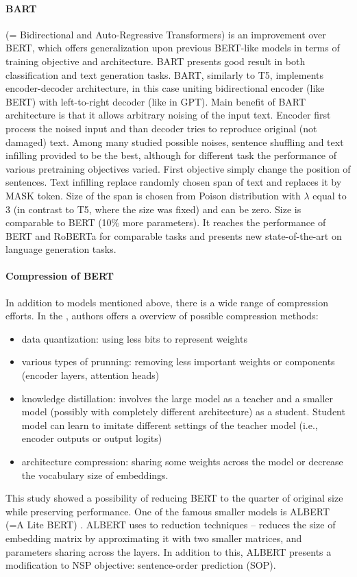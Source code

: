 \paragraph{BART} (= Bidirectional and Auto-Regressive Transformers) \citep{Lewis2019} is an improvement over BERT, which offers generalization upon previous BERT-like models in terms of training objective and architecture. BART presents good result in both classification and text generation tasks. BART, similarly to T5, implements encoder-decoder architecture, in this case uniting bidirectional encoder (like BERT) with left-to-right decoder (like in GPT). Main benefit of BART architecture is that it allows arbitrary noising of the input text. Encoder first process the noised input and than decoder tries to reproduce original (not damaged) text. Among many studied possible noises, sentence shuffling and text infilling provided to be the best, although for different task the performance of various pretraining objectives varied. First objective simply change the position of sentences. Text infilling replace randomly chosen span of text and replaces it by MASK token. Size of the span is chosen from Poison distribution with $\lambda$ equal to 3 (in contrast to T5, where the size was fixed) and can be zero. Size is comparable to BERT (10\% more parameters). It reaches the performance of BERT and RoBERTa  for comparable tasks and presents new state-of-the-art on language generation tasks.
\paragraph{Compression of BERT} In addition to models mentioned above, there is a wide range of compression efforts.  In the \citep{Ganesh2020}, authors offers a overview of possible compression methods:
\begin{itemize}
\item data quantization: using less bits to represent weights
\item various types of prunning: removing less important weights or components (encoder layers, attention heads)
\item knowledge distillation: involves the large model as a teacher and a smaller model (possibly with completely different architecture) as a student. Student model can learn to imitate different settings of the teacher model (i.e., encoder outputs or output logits)
\item architecture compression: sharing some weights across the model or decrease the vocabulary size of embeddings.
\end{itemize}
This study showed a possibility of reducing BERT to the quarter of original size while preserving performance. One of the famous smaller models is ALBERT (=A Lite BERT) \citep{Lan2019}. ALBERT uses to reduction techniques -- reduces the size of embedding matrix by approximating it with two smaller matrices, and parameters sharing across the layers. In addition to this, ALBERT presents a modification to NSP objective: sentence-order prediction (SOP).

